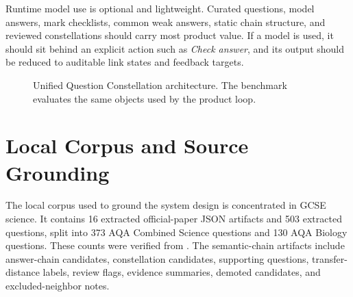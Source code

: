 \documentclass[11pt]{article}
\begin{document}
Runtime model use is optional and lightweight. Curated questions, model answers, mark checklists, common weak answers, static chain structure, and reviewed constellations should carry most product value. If a model is used, it should sit behind an explicit action such as \textit{Check answer}, and its output should be reduced to auditable link states and feedback targets.

\begin{figure}[H]
\centering
{}
\caption{Unified Question Constellation architecture. The benchmark evaluates the same objects used by the product loop.}
\label{fig:architecture}
\end{figure}

\section{Local Corpus and Source Grounding}

The local corpus used to ground the system design is concentrated in GCSE science. It contains 16 extracted official-paper JSON artifacts and 503 extracted questions, split into 373 AQA Combined Science questions and 130 AQA Biology questions. These counts were verified from . The semantic-chain artifacts include answer-chain candidates, constellation candidates, supporting questions, transfer-distance labels, review flags, evidence summaries, demoted candidates, and excluded-neighbor notes.
\end{document}
